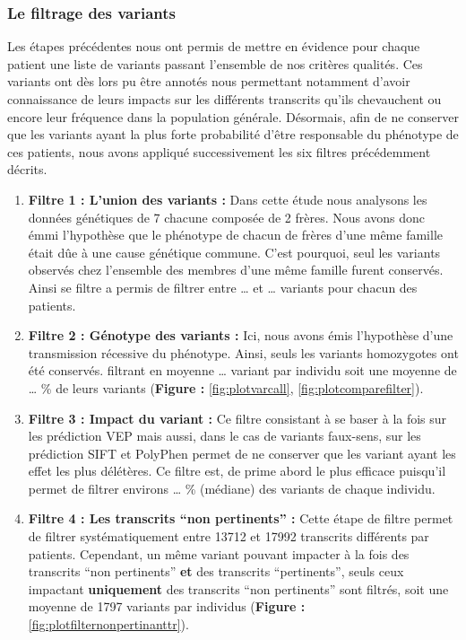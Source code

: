 \documentclass[12pt,twoside]{reedthesis}
\theoremstyle{definition}
\theoremstyle{definition}
\theoremstyle{remark}
\begin{document}
  \subsubsection{Le filtrage des
  variants}\label{le-filtrage-des-variants-1}
  
  Les étapes précédentes nous ont permis de mettre en évidence pour chaque
  patient une liste de variants passant l'ensemble de nos critères
  qualités. Ces variants ont dès lors pu être annotés nous permettant
  notamment d'avoir connaissance de leurs impacts sur les différents
  transcrits qu'ils chevauchent ou encore leur fréquence dans la
  population générale. Désormais, afin de ne conserver que les variants
  ayant la plus forte probabilité d'être responsable du phénotype de ces
  patients, nous avons appliqué successivement les six filtres
  précédemment décrits.
  
  \begin{enumerate}
  \def\labelenumi{\arabic{enumi}.}
  \item
    \textbf{Filtre 1 : L'union des variants :} Dans cette étude nous
    analysons les données génétiques de 7 chacune composée de 2 frères.
    Nous avons donc émmi l'hypothèse que le phénotype de chacun de frères
    d'une même famille était dûe à une cause génétique commune. C'est
    pourquoi, seul les variants observés chez l'ensemble des membres d'une
    même famille furent conservés. Ainsi se filtre a permis de filtrer
    entre \ldots{} et \ldots{} variants pour chacun des patients.
  \item
    \textbf{Filtre 2 : Génotype des variants :} Ici, nous avons émis
    l'hypothèse d'une transmission récessive du phénotype. Ainsi, seuls
    les variants homozygotes ont été conservés. filtrant en moyenne
    \ldots{} variant par individu soit une moyenne de \ldots{} \% de leurs
    variants (\textbf{Figure : }\ref{fig:plotvarcall},
    \ref{fig:plotcomparefilter}).
  \item
    \textbf{Filtre 3 : Impact du variant :} Ce filtre consistant à se
    baser à la fois sur les prédiction VEP mais aussi, dans le cas de
    variants faux-sens, sur les prédiction SIFT et PolyPhen permet de ne
    conserver que les variant ayant les effet les plus délétères. Ce
    filtre est, de prime abord le plus efficace puisqu'il permet de
    filtrer environs \ldots{} \% (médiane) des variants de chaque
    individu.
  \item
    \textbf{Filtre 4 : Les transcrits ``non pertinents'' :} Cette étape de
    filtre permet de filtrer systématiquement entre 13712 et 17992
    transcrits différents par patients. Cependant, un même variant pouvant
    impacter à la fois des transcrits ``non pertinents'' \textbf{et} des
    transcrits ``pertinents'', seuls ceux impactant \textbf{uniquement}
    des transcrits ``non pertinents'' sont filtrés, soit une moyenne de
    1797 variants par individus (\textbf{Figure :
    }\ref{fig:plotfilternonpertinanttr}).
  \end{enumerate}
  
\end{document}
